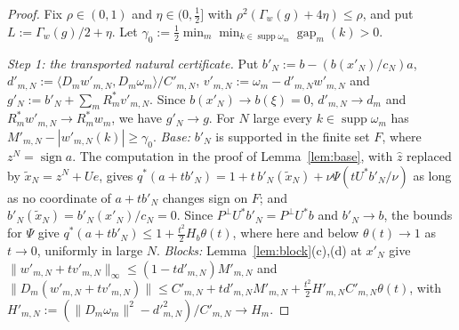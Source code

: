\documentclass[10pt]{amsart}
\theoremstyle{definition}
\theoremstyle{remark}
\newcommand{\supp}{\operatorname{supp}}
\newcommand{\sgn}{\operatorname{sign}}
\newcommand{\gap}{\operatorname{gap}}
\newcommand{\zh}{\hat z}
\newcommand{\ip}[2]{\langle #1,#2\rangle}
\begin{document}
\begin{proof}
Fix $\rho\in(0,1)$ and $\eta\in(0,\frac12]$ with $\rho^2(\Gamma_w(g)+4\eta)\le\rho$, and
put $L:=\Gamma_w(g)/2+\eta$.  Let $\gamma_0:=\frac12\min_m\min_{k\in\supp
\omega_m}\gap_m(k)>0$.

\emph{Step 1: the transported natural certificate.}  Put
$b'_N:=b-(b(x'_N)/c_N)a$, $d'_{m,N}:=\ip{D_mw'_{m,N}}{D_m\omega_m}/C'_{m,N}$,
$v'_{m,N}:=\omega_m-d'_{m,N}w'_{m,N}$ and
$g'_N:=b'_N+\sum_mR_m^*v'_{m,N}$.  Since $b(x'_N)\to b(\xi)=0$,
$d'_{m,N}\to d_m$ and $R_m^*w'_{m,N}\to R_m^*w_m$, we have $g'_N\to g$.  For
$N$ large every $k\in\supp\omega_m$ has $M'_{m,N}-|w'_{m,N}(k)|\ge\gamma_0$.
\emph{Base:} $b'_N$ is supported in the finite set $F$, where
$z^N=\sgn a$.  The computation in the proof of Lemma~\ref{lem:base}, with
$\zh$ replaced by $\tilde x_N=z^N+Ue$, gives
$q^*(a+tb'_N)=1+t\,b'_N(\tilde x_N)+\nu\Psi(tU^*b'_N/\nu)$ as long as no
coordinate of $a+tb'_N$ changes sign on $F$; and
$b'_N(\tilde x_N)=b'_N(x'_N)/c_N=0$.  Since $P^\perp U^*b'_N=P^\perp U^*b$
and $b'_N\to b$, the bounds for $\Psi$ give
$q^*(a+tb'_N)\le1+\frac{t^2}2H_b\theta(t)$, where here and below
$\theta(t)\to1$ as $t\to0$, uniformly in large $N$.
\emph{Blocks:} Lemma~\ref{lem:block}(c),(d) at $x'_N$ give
$\|w'_{m,N}+tv'_{m,N}\|_\infty\le(1-td'_{m,N})M'_{m,N}$ and
$\|D_m(w'_{m,N}+tv'_{m,N})\|\le C'_{m,N}+td'_{m,N}M'_{m,N}+\frac{t^2}2
H'_{m,N}C'_{m,N}\theta(t)$, with $H'_{m,N}:=(\|D_m\omega_m\|^2-d'^2_{m,N})/
C'_{m,N}\to H_m$.


\end{proof}
\end{document}
